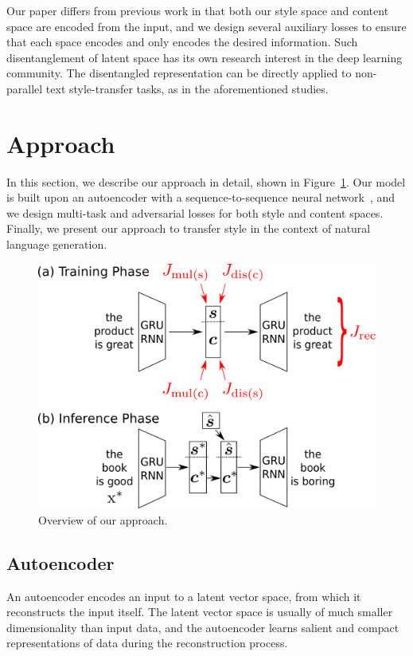\documentclass[letterpaper]{article} %
\begin{document}
Our paper differs from previous work in that both our style space and content space are encoded from the input, and we design several auxiliary losses to ensure that each space encodes and only encodes the desired information.
Such disentanglement of latent space has its own research interest in the deep learning community.
The disentangled representation can be directly applied to non-parallel text style-transfer tasks, as in the aforementioned studies.


\section{Approach}

In this section, we describe our approach in detail, shown in Figure~\ref{fig:overview}.
Our model is built upon an autoencoder with a sequence-to-sequence neural network~\cite{sutskever2014sequence}, and we design multi-task and adversarial losses for both style and content spaces.
Finally, we present our approach to transfer style in the context of natural language generation.

\begin{figure}[!t]
	\centering
	\includegraphics[width=.9\linewidth]{model-overview}
	\caption{Overview of our approach.}
	\label{fig:overview}
\end{figure}

\subsection{Autoencoder} \label{ssec:seq2seq-autoencoder}

An autoencoder encodes an input to a latent vector space, from which it reconstructs the input itself.
The latent vector space is usually of much smaller dimensionality than input data, and the autoencoder learns salient and compact representations of data during the reconstruction process.
\end{document}
